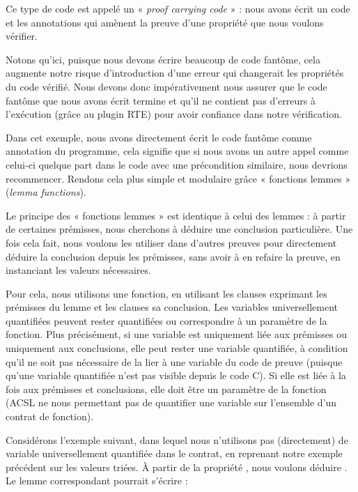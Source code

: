 



Ce type de code est appelé un « \textit{proof carrying code} » : nous avons écrit
un code et les annotations qui amènent la preuve d'une propriété que nous voulons
vérifier.


Notons qu'ici, puisque nous devons écrire beaucoup de code fantôme, cela augmente
notre risque d'introduction d'une erreur qui changerait les propriétés du code
vérifié. Nous devons donc impérativement nous assurer que le code fantôme que
nous avons écrit termine et qu'il ne contient pas d'erreurs à l'exécution
(grâce au plugin RTE) pour avoir confiance dans notre vérification.


Dans cet exemple, nous avons directement écrit le code fantôme comme annotation du
programme, cela signifie que si nous avons un autre appel comme celui-ci quelque
part dans le code avec une précondition similaire, nous devrions recommencer.
Rendons cela plus simple et modulaire grâce « fonctions lemmes »
(\textit{lemma functions}).





Le principe des « fonctions lemmes » est identique à celui des lemmes : à
partir de certaines prémisses, nous cherchons à déduire une conclusion particulière.
Une fois cela fait, nous voulons les utiliser dans d'autres preuves
pour directement déduire la conclusion depuis les prémisses, sans avoir à
en refaire la preuve, en instanciant les valeurs nécessaires.


Pour cela, nous utilisons une fonction, en utilisant les clauses
 exprimant les prémisses du lemme et les clauses
 sa conclusion. Les variables
universellement quantifiées peuvent rester quantifiées ou correspondre à un
paramètre de la fonction. Plus précisément, si une variable est uniquement liée
aux prémisses ou uniquement aux conclusions, elle peut rester une variable
quantifiée, à condition qu'il ne soit pas nécessaire de la lier à une variable
du code de preuve (puisque qu'une variable quantifiée n'est pas visible depuis
le code C). Si elle est liée à la fois aux prémisses et conclusions, elle doit
être un paramètre de la fonction (ACSL ne nous permettant pas de quantifier une
variable sur l'ensemble d'un contrat de fonction).


Considérons l'exemple suivant, dans lequel nous n'utilisons pas (directement) de
variable universellement quantifiée dans le contrat, en reprenant notre exemple
précédent sur les valeurs triées. À partir de la propriété
, nous voulons déduire
. Le lemme correspondant pourrait s'écrire :


